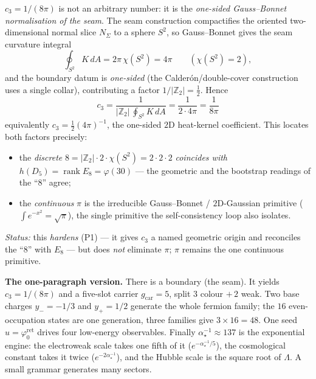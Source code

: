 \documentclass[11pt,a4paper]{article}
\newcommand{\gcar}{g_{\mathrm{car}}}
\newcommand{\cthree}{c_3}
\newcommand{\useed}{u}
\newcommand{\ainv}{\alpha^{-1}_\star}
\newcommand{\Z}{\mathbb{Z}}
\theoremstyle{definition}
\begin{document}
\begin{keybox}[Hardening (P1): the Gauss--Bonnet origin of $c_3=\tfrac1{8\pi}$]
$\cthree=1/(8\pi)$ is not an arbitrary number: it is the \emph{one-sided Gauss--Bonnet normalisation of
the seam}. The seam construction compactifies the oriented two-dimensional normal slice $N_\Sigma$ to a sphere $S^2$,
so Gauss--Bonnet gives the seam curvature integral
\[
  \oint_{S^2}K\,dA=2\pi\,\chi(S^2)=4\pi\qquad(\chi(S^2)=2),
\]
and the boundary datum is \emph{one-sided} (the Calder\'on/double-cover construction uses a single
collar), contributing a factor $1/|\Z_2|=\tfrac12$. Hence
\[
  \boxed{\ \cthree=\frac{1}{|\Z_2|\,\oint_{S^2}K\,dA}=\frac{1}{2\cdot 4\pi}=\frac{1}{8\pi}\ }
\]
\noindent equivalently $\cthree=\tfrac12(4\pi)^{-1}$, the one-sided $2$D heat-kernel coefficient.
This locates both factors precisely:
\begin{itemize}\setlength\itemsep{1pt}
\item the \emph{discrete} $8=|\Z_2|\cdot2\cdot\chi(S^2)=2\cdot2\cdot2$ \emph{coincides with} $h(D_5)=\operatorname{rank}E_8=\varphi(30)$
--- the geometric and the bootstrap readings of the ``$8$'' agree;
\item the \emph{continuous} $\pi$ is the irreducible Gauss--Bonnet / $2$D-Gaussian primitive ($\int e^{-x^2}=\sqrt\pi$), the single primitive the self-consistency loop also isolates.
\end{itemize}
\emph{Status:} this \emph{hardens} (P1) --- it gives $\cthree$ a named geometric origin and reconciles the
``$8$'' with $E_8$ --- but does \emph{not} eliminate $\pi$; $\pi$ remains the one continuous primitive. \mC
\end{keybox}

\par\medskip
\noindent\textbf{The one-paragraph version.}
There is a boundary (the seam). It yields $\cthree=1/(8\pi)$ and a five-slot carrier $\gcar=5$,
split $3$ colour $+\,2$ weak. Two base charges $y_-=-1/3$ and $y_+=1/2$ generate the whole
fermion family; the $16$ even-occupation states are one generation, three families give
$3\times16=48$. One seed $\useed=\varphi^{\mathrm{ret}}_0$ drives four low-energy observables. Finally
$\ainv\approx137$ is the exponential engine: the electroweak scale takes one fifth of it
($e^{-\ainv/5}$), the cosmological constant takes it twice ($e^{-2\ainv}$), and the Hubble scale is
the square root of $\Lambda$. A small grammar generates many sectors.
\par\medskip

\end{document}
